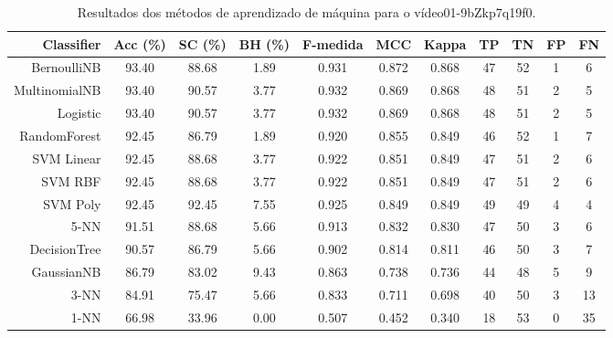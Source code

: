 \begin{table}[!htb]
\centering
\caption{Resultados dos métodos de aprendizado de máquina para o vídeo01-9bZkp7q19f0.}
\label{tab:01-9bZkp7q19f0}
\begin{tabular}{r|c|c|c|c|c|c|c|c|c|c}
\hline\hline
Classifier & Acc (\%) & SC (\%) & BH (\%) & F-medida & MCC & Kappa & TP & TN & FP & FN \\ \hline
BernoulliNB & 93.40 & 88.68 & 1.89 & 0.931 & 0.872 & 0.868 & 47 & 52 & 1 & 6 \\ 
MultinomialNB & 93.40 & 90.57 & 3.77 & 0.932 & 0.869 & 0.868 & 48 & 51 & 2 & 5 \\ 
Logistic & 93.40 & 90.57 & 3.77 & 0.932 & 0.869 & 0.868 & 48 & 51 & 2 & 5 \\ 
RandomForest & 92.45 & 86.79 & 1.89 & 0.920 & 0.855 & 0.849 & 46 & 52 & 1 & 7 \\ 
SVM Linear & 92.45 & 88.68 & 3.77 & 0.922 & 0.851 & 0.849 & 47 & 51 & 2 & 6 \\ 
SVM RBF & 92.45 & 88.68 & 3.77 & 0.922 & 0.851 & 0.849 & 47 & 51 & 2 & 6 \\ 
SVM Poly & 92.45 & 92.45 & 7.55 & 0.925 & 0.849 & 0.849 & 49 & 49 & 4 & 4 \\ 
5-NN & 91.51 & 88.68 & 5.66 & 0.913 & 0.832 & 0.830 & 47 & 50 & 3 & 6 \\ 
DecisionTree & 90.57 & 86.79 & 5.66 & 0.902 & 0.814 & 0.811 & 46 & 50 & 3 & 7 \\ 
GaussianNB & 86.79 & 83.02 & 9.43 & 0.863 & 0.738 & 0.736 & 44 & 48 & 5 & 9 \\ 
3-NN & 84.91 & 75.47 & 5.66 & 0.833 & 0.711 & 0.698 & 40 & 50 & 3 & 13 \\ 
1-NN & 66.98 & 33.96 & 0.00 & 0.507 & 0.452 & 0.340 & 18 & 53 & 0 & 35 \\ 
\hline\hline
\end{tabular}
\end{table}

